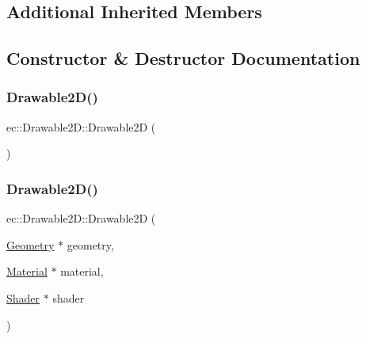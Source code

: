 \subsection*{Additional Inherited Members}


\subsection{Constructor \& Destructor Documentation}
\mbox{\label{classec_1_1_drawable2_d_aa101d038e1ec6b969d37e39c7db804ae}} 
\subsubsection{\texorpdfstring{Drawable2\+D()}{Drawable2D()}\hspace{0.1cm}{\footnotesize\ttfamily [1/2]}}
{\footnotesize\ttfamily ec\+::\+Drawable2\+D\+::\+Drawable2D (\begin{DoxyParamCaption}{ }\end{DoxyParamCaption})\hspace{0.3cm}{\ttfamily [explicit]}}

\mbox{\label{classec_1_1_drawable2_d_a421840d2cde9fb991f9eef22eb77cc8e}} 
\subsubsection{\texorpdfstring{Drawable2\+D()}{Drawable2D()}\hspace{0.1cm}{\footnotesize\ttfamily [2/2]}}
{\footnotesize\ttfamily ec\+::\+Drawable2\+D\+::\+Drawable2D (\begin{DoxyParamCaption}\item[{\mbox{\hyperlink{classec_1_1_geometry}{Geometry}} $\ast$}]{geometry,  }\item[{\mbox{\hyperlink{classec_1_1_material}{Material}} $\ast$}]{material,  }\item[{\mbox{\hyperlink{classec_1_1_shader}{Shader}} $\ast$}]{shader }\end{DoxyParamCaption})\hspace{0.3cm}{\ttfamily [explicit]}}

